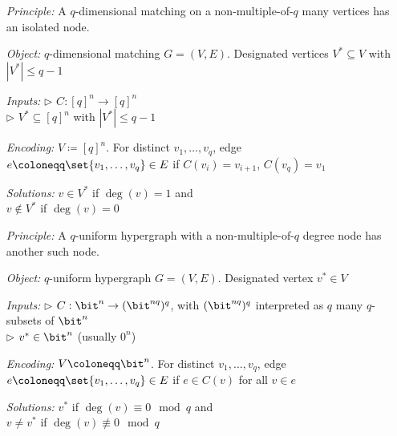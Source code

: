 \noindent
\begin{minipage}{\linewidth}
\begin{definition}
	\label{def:lonely} \vspace{-5pt}
	\begin{itemize}[leftmargin=2.15cm,itemsep=4pt]
		\item[\slshape Principle:] A $q$-dimensional matching on a non-multiple-of-$q$ many vertices has an isolated node.
		\item[\slshape Object:] $q$-dimensional matching $G = (V, E)$. Designated vertices $V^* \subseteq V$ with $|V^*| \le q-1$
		\item[\slshape Inputs:] $\triangleright$ $C:[q]^n \to [q]^n$\\
	$\triangleright$ $V^* \subseteq [q]^n$ with $|V^*| \le q-1$
		\item[\slshape Encoding:] $V\coloneqq[q]^n$. For distinct $v_1, \ldots, v_q$, edge $e\coloneqq\set{v_1, \ldots, v_q}\in E$ if $C(v_i) = v_{i+1}$, $C(v_q) = v_1$
		\item[\slshape Solutions:] $v \in V^*$ if $\deg(v) = 1$ and\\
	$v \notin V^*$ if $\deg(v) = 0$
	\end{itemize}
\end{definition}
\end{minipage}\vspace{5mm}



\noindent
\begin{minipage}{\linewidth}
\begin{definition}
	\label{def:leaf} \vspace{-5pt}
	\begin{itemize}[leftmargin=2.15cm,itemsep=4pt]
		\item[\slshape Principle:] A $q$-uniform hypergraph with a non-multiple-of-$q$ degree node has another such node.
		\item[\slshape Object:] $q$-uniform hypergraph $G = (V, E)$. Designated vertex $v^* \in V$
		\item[\slshape Inputs:] $\triangleright$ $C:\bit^n \to (\bit^{nq})^q$, with $(\bit^{nq})^q$ interpreted as $q$ many $q$-subsets of $\bit^n$\\
	$\triangleright$ $v^* \in \bit^n$ (usually $0^n$)
		\item[\slshape Encoding:] $V\coloneqq\bit^n$. For distinct $v_1, \ldots, v_q$, edge $e\coloneqq\set{v_1, \ldots, v_q}\in E$ if $e \in C(v)$ for all $v \in e$
		\item[\slshape Solutions:] $v^*$ if $\deg(v) \equiv 0 \mod{q}$ and\\
	$v \ne v^*$ if $\deg(v) \not\equiv 0 \mod{q}$
	\end{itemize}
\end{definition}
\end{minipage}\vspace{5mm}


